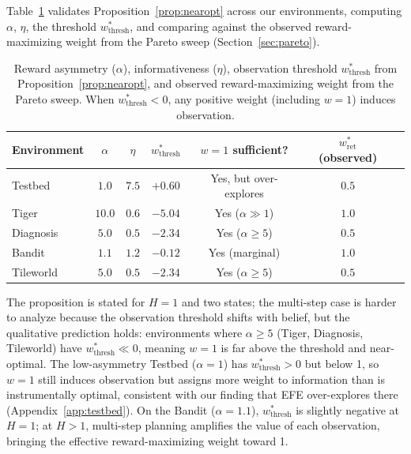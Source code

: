 \documentclass[runningheads]{llncs}
\begin{document}
Table~\ref{tab:alpha_eta} validates Proposition~\ref{prop:nearopt} across our environments, computing $\alpha$, $\eta$, the threshold $w^*_{\text{thresh}}$, and comparing against the observed reward-maximizing weight from the Pareto sweep (Section~\ref{sec:pareto}).

\begin{table}[ht]
\centering
\caption{Reward asymmetry ($\alpha$), informativeness ($\eta$), observation threshold $w^*_{\text{thresh}}$ from Proposition~\ref{prop:nearopt}, and observed reward-maximizing weight from the Pareto sweep. When $w^*_{\text{thresh}} < 0$, any positive weight (including $w{=}1$) induces observation.}
\label{tab:alpha_eta}
\begin{small}
\begin{tabular}{lcccccc}
\toprule
Environment & $\alpha$ & $\eta$ & $w^*_{\text{thresh}}$ & $w{=}1$ sufficient? & $w^*_{\text{ret}}$ (observed) \\
\midrule
Testbed & $1.0$ & $7.5$ & $+0.60$ & Yes, but over-explores & $0.5$ \\
Tiger & $10.0$ & $0.6$ & $-5.04$ & Yes ($\alpha \gg 1$) & $1.0$ \\
Diagnosis & $5.0$ & $0.5$ & $-2.34$ & Yes ($\alpha \geq 5$) & $0.5$ \\
Bandit & $1.1$ & $1.2$ & $-0.12$ & Yes (marginal) & $1.0$ \\
Tileworld & $5.0$ & $0.5$ & $-2.34$ & Yes ($\alpha \geq 5$) & $0.5$ \\
\bottomrule
\end{tabular}
\end{small}
\end{table}

The proposition is stated for $H{=}1$ and two states; the multi-step case is harder to analyze because the observation threshold shifts with belief, but the qualitative prediction holds: environments where $\alpha \geq 5$ (Tiger, Diagnosis, Tileworld) have $w^*_{\text{thresh}} \ll 0$, meaning $w{=}1$ is far above the threshold and near-optimal. The low-asymmetry Testbed ($\alpha{=}1$) has $w^*_{\text{thresh}} > 0$ but below 1, so $w{=}1$ still induces observation but assigns more weight to information than is instrumentally optimal, consistent with our finding that EFE over-explores there (Appendix~\ref{app:testbed}). On the Bandit ($\alpha{=}1.1$), $w^*_{\text{thresh}}$ is slightly negative at $H{=}1$; at $H{>}1$, multi-step planning amplifies the value of each observation, bringing the effective reward-maximizing weight toward 1.
\end{document}
